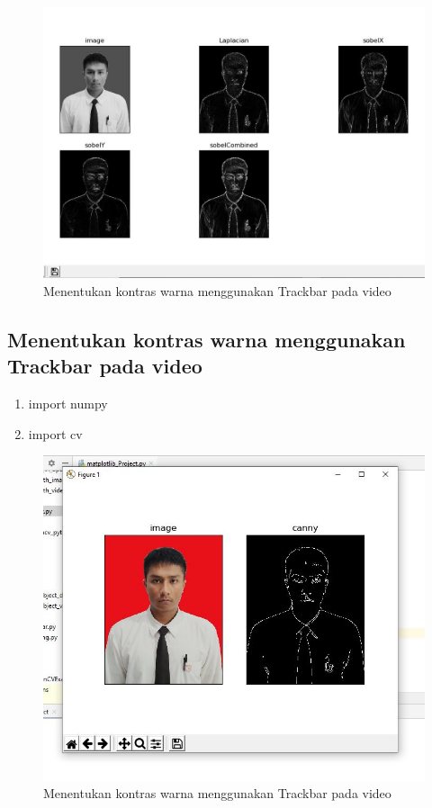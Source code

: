 \newpage
\begin{figure}[ht]
\centering
\includegraphics[scale=0.5]{figures/2,68.jpg}
\caption{Menentukan kontras warna menggunakan Trackbar pada video}
\label{contoh}
\end{figure}







\newpage
\subsection{Menentukan kontras warna menggunakan Trackbar pada video}

\begin{enumerate}
	\item import numpy
	\item import cv
\end{enumerate}

\newpage
\begin{figure}[ht]
\centering
\includegraphics[scale=0.5]{figures/2,69.jpg}
\caption{Menentukan kontras warna menggunakan Trackbar pada video}
\label{contoh}
\end{figure}








